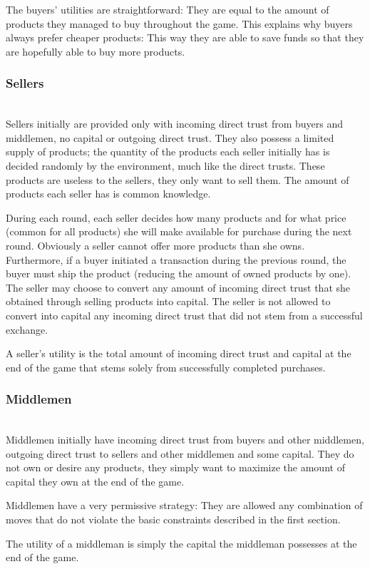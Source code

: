     The buyers' utilities are straightforward: They are equal to the amount of products they managed to buy throughout the
    game. This explains why buyers always prefer cheaper products: This way they are able to save funds so that they are
    hopefully able to buy more products.

  \subsubsection{Sellers} \ \\

    Sellers initially are provided only with incoming direct trust from buyers and middlemen, no capital or outgoing direct
    trust. They also possess a limited supply of products; the quantity of the products each seller initially has is decided
    randomly by the environment, much like the direct trusts. These products are useless to the sellers, they only want to
    sell them. The amount of products each seller has is common knowledge.
    
    During each round, each seller decides how many products and for what price (common for all products) she will make
    available for purchase during the next round. Obviously a seller cannot offer more products than she owns. Furthermore, if
    a buyer initiated a transaction during the previous round, the buyer must ship the product (reducing the amount of owned
    products by one). The seller may choose to convert any amount of incoming direct trust that she obtained through selling
    products into capital. The seller is not allowed to convert into capital any incoming direct trust that did not stem from
    a successful exchange.

    A seller's utility is the total amount of incoming direct trust and capital at the end of the game that stems solely from
    successfully completed purchases.

  \subsubsection{Middlemen} \ \\

    Middlemen initially have incoming direct trust from buyers and other middlemen, outgoing direct trust to sellers and other
    middlemen and some capital. They do not own or desire any products, they simply want to maximize the amount of capital
    they own at the end of the game.

    Middlemen have a very permissive strategy: They are allowed any combination of moves that do not violate the basic
    constraints described in the first section.

    The utility of a middleman is simply the capital the middleman possesses at the end of the game.
